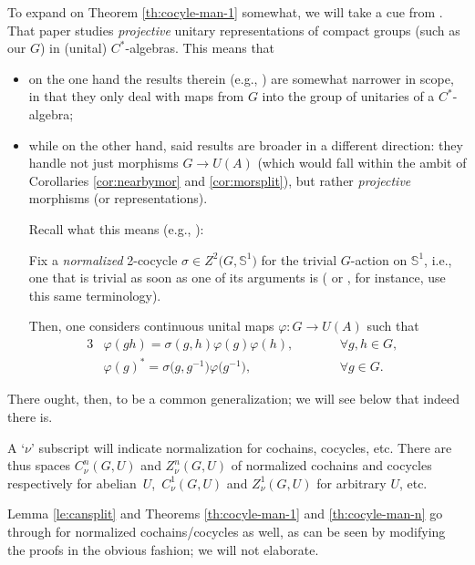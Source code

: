 \documentclass[pdftex]{sigma}
\numberwithin{equation}{section}
\newcommand\bS{{\mathbb S}}
\begin{document}
To expand on Theorem \ref{th:cocyle-man-1} somewhat, we will take a cue from \cite{mart-proj}. That paper studies {\it projective} unitary representations of compact groups (such as our $G$) in (unital) $C^*$-algebras. This means that
\begin{itemize}\itemsep=0pt
\item on the one hand the results therein (e.g., \cite[Proposition 1.7, 2.2 and 2.3]{mart-proj}) are somewhat narrower in scope, in that they only deal with maps from $G$ into the group of unitaries of a $C^*$-algebra;
\item while on the other hand, said results are broader in a different direction: they handle not just morphisms $G\to U(A)$ (which would fall within the ambit of Corollaries \ref{cor:nearbymor} and \ref{cor:morsplit}), but rather {\it projective} morphisms (or representations).

 Recall what this means (e.g., \cite[Section~1.4]{mart-proj}):

 Fix a {\it normalized} 2-cocycle $\sigma\in Z^2\big(G,\bS^1\big)$ for the trivial $G$-action on $\bS^1$, i.e., one that is trivial as soon as one of its arguments is (\cite[Section~III.1]{br-coh} or \cite[Section~2.3]{ev-coh}, for instance, use this same terminology).

 Then, one considers continuous unital maps $\varphi\colon G\to U(A)$ such that
 \begin{alignat*}{3}
 &\varphi(gh) = \sigma(g,h)\varphi(g)\varphi(h),\qquad &&\forall g,h\in G,&\\
 &\varphi(g)^*= \sigma\big(g,g^{-1}\big) \varphi\big(g^{-1}\big),\qquad &&\forall g\in G.&
 \end{alignat*}
\end{itemize}

There ought, then, to be a common generalization; we will see below that indeed there is.

\begin{Notation}\label{not:norm}
A `$\nu$' subscript will indicate normalization for cochains, cocycles, etc. There are thus spaces $C^n_{\nu}(G,U)$ and $Z^n_{\nu}(G,U)$ of normalized cochains and cocycles respectively for abelian~$U$,~$C^1_{\nu}(G,U)$ and $Z^1_{\nu}(G,U)$ for arbitrary $U$, etc.

Lemma \ref{le:cansplit} and Theorems \ref{th:cocyle-man-1} and \ref{th:cocyle-man-n} go through for normalized cochains/cocycles as well, as can be seen by modifying the proofs in the obvious fashion; we will not elaborate.
\end{Notation}
\end{document}
